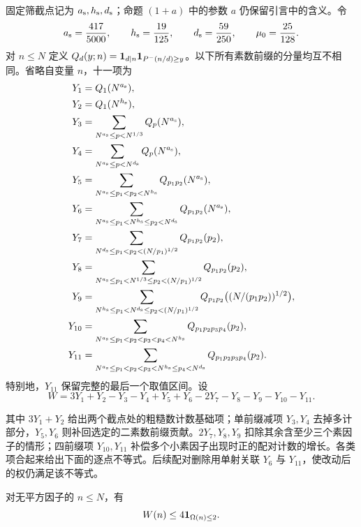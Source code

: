 固定筛截点记为 $a_{\rm s},h_{\rm s},d_{\rm s}$；命题 $(1+a)$ 中的参数 $a$ 仍保留引言中的含义。令
\[
 {a_{\rm s}}=\frac{417}{5000},\qquad {h_{\rm s}}=\frac{19}{125},\qquad
 {d_{\rm s}}=\frac{59}{250},\qquad \mu_0=\frac{25}{128}.
\]
对 $n\le N$ 定义 $Q_d(y;n)=\mathbf 1_{d\mid n}\mathbf 1_{P^-(n/d)\ge y}$。以下所有素数前缀的分量均互不相同。省略自变量 $n$，十一项为
\begingroup\allowdisplaybreaks[4]
\begin{align*}
 Y_1&=Q_1(N^{a_{\rm s}}),\\
 Y_2&=Q_1(N^{h_{\rm s}}),\\
 Y_3&=\sum_{N^{a_{\rm s}}\le p<N^{1/3}}Q_p(N^{a_{\rm s}}),\\
 Y_4&=\sum_{N^{a_{\rm s}}\le p<N^{d_{\rm s}}}Q_p(N^{a_{\rm s}}),\\
 Y_5&=\sum_{N^{a_{\rm s}}\le p_1<p_2<N^{h_{\rm s}}}Q_{p_1p_2}(N^{a_{\rm s}}),\\
 Y_6&=\sum_{N^{a_{\rm s}}\le p_1<N^{h_{\rm s}}\le p_2<N^{d_{\rm s}}}Q_{p_1p_2}(N^{a_{\rm s}}),\\
 Y_7&=\sum_{N^{d_{\rm s}}\le p_1<p_2<(N/p_1)^{1/2}}Q_{p_1p_2}(p_2),\\
 Y_8&=\sum_{N^{a_{\rm s}}\le p_1<N^{1/3}\le p_2<(N/p_1)^{1/2}}
                                          Q_{p_1p_2}(p_2),\\
 Y_9&=\sum_{N^{h_{\rm s}}\le p_1<N^{d_{\rm s}}\le p_2<(N/p_1)^{1/2}}
                   Q_{p_1p_2}\bigl((N/(p_1p_2))^{1/2}\bigr),\\
 Y_{10}&=\sum_{N^{a_{\rm s}}\le p_1<p_2<p_3<p_4<N^{h_{\rm s}}}Q_{p_1p_2p_3p_4}(p_2),\\
 Y_{11}&=\sum_{N^{a_{\rm s}}\le p_1<p_2<p_3<N^{h_{\rm s}}\le p_4<N^{d_{\rm s}}}
                                          Q_{p_1p_2p_3p_4}(p_2).
\end{align*}
\endgroup
特别地，$Y_{11}$ 保留完整的最后一个取值区间。设
\begin{equation}
 W=3Y_1+Y_2-Y_3-Y_4+Y_5+Y_6-2Y_7-Y_8-Y_9-Y_{10}-Y_{11}.
 \label{eq:current-full-weight}
\end{equation}

其中 $3Y_1+Y_2$ 给出两个截点处的粗糙数计数基础项；单前缀减项 $Y_3,Y_4$ 去掉多计部分，$Y_5,Y_6$ 则补回选定的二素数前缀贡献。$2Y_7,Y_8,Y_9$ 扣除其余含至少三个素因子的情形；四前缀项 $Y_{10},Y_{11}$ 补偿多个小素因子出现时正的配对计数的增长。各类项合起来给出下面的逐点不等式。后续配对删除用单射关联 $Y_6$ 与 $Y_{11}$，使改动后的权仍满足该不等式。

\begin{lemma}[完整权的逐点不等式]
\label{lem:current-full-weight}
对无平方因子的 $n\le N$，有
\[
                  W(n)\le4{\mathbf 1}_{\Omega(n)\le2}.
\]
\end{lemma}

